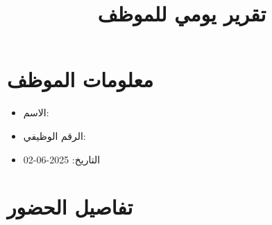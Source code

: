\documentclass{article}
\title{تقرير يومي للموظف}
\begin{document}
\maketitle

\section*{معلومات الموظف}
\begin{itemize}
  \item الاسم: 
  \item الرقم الوظيفي: 
  \item التاريخ: 2025-06-02
\end{itemize}

\section*{تفاصيل الحضور}
\end{document}
